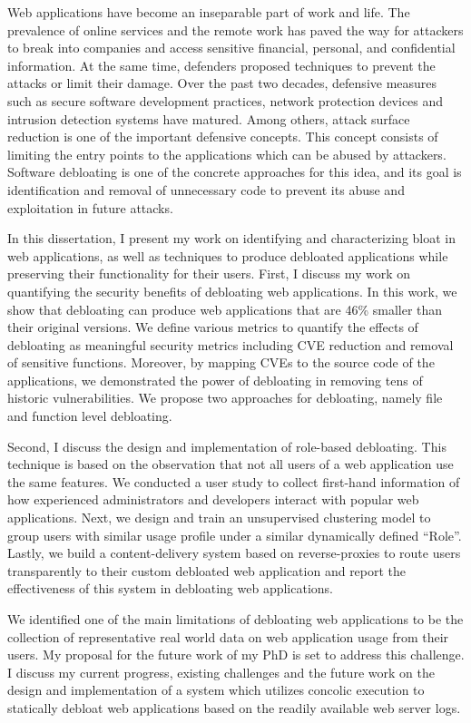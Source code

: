 Web applications have become an inseparable part of work and life. 
The prevalence of online services and the remote work has paved the way for attackers to break into companies and access sensitive financial, personal, and confidential information. 
At the same time, defenders proposed techniques to prevent the attacks or limit their damage. 
Over the past two decades, defensive measures such as secure software development practices, network protection devices and intrusion detection systems have matured. 
Among others, attack surface reduction is one of the important defensive concepts. 
This concept consists of limiting the entry points to the applications which can be abused by attackers. 
Software debloating is one of the concrete approaches for this idea, and its goal is identification and removal of unnecessary code to prevent its abuse and exploitation in future attacks. 

In this dissertation, I present my work on identifying and characterizing bloat in web applications, as well as techniques to produce debloated applications while preserving their functionality for their users. 
First, I discuss my work on quantifying the security benefits of debloating web applications. 
In this work, we show that debloating can produce web applications that are 46\% smaller than their original versions. 
We define various metrics to quantify the effects of debloating as meaningful security metrics including CVE reduction and removal of sensitive functions. 
Moreover, by mapping CVEs to the source code of the applications, we demonstrated the power of debloating in removing tens of historic vulnerabilities. 
We propose two approaches for debloating, namely file and function level debloating. 

Second, I discuss the design and implementation of role-based debloating. 
This technique is based on the observation that not all users of a web application use the same features. 
We conducted a user study to collect first-hand information of how experienced administrators and developers interact with popular web applications. 
Next, we design and train an unsupervised clustering model to group users with similar usage profile under a similar dynamically defined ``Role''. 
Lastly, we build a content-delivery system based on reverse-proxies to route users transparently to their custom debloated web application and report the effectiveness of this system in debloating web applications. 

We identified one of the main limitations of debloating web applications to be the collection of representative real world data on web application usage from their users. My proposal for the future work of my PhD is set to address this challenge. 
I discuss my current progress, existing challenges and the future work on the design and implementation of a system which utilizes concolic execution to statically debloat web applications based on the readily available web server logs. 

